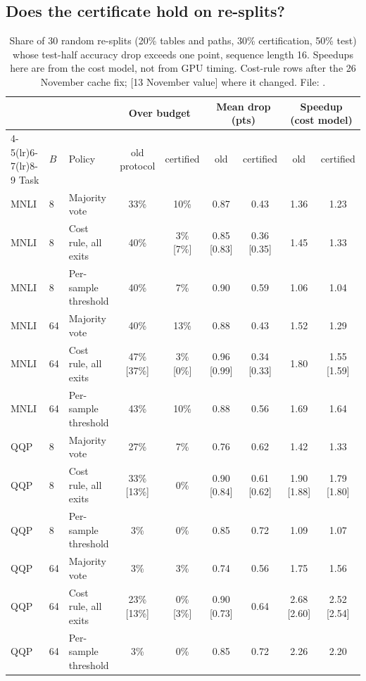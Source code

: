 \subsection{Does the certificate hold on re-splits?}\label{sec:resplit}
\begin{table}[ht]
  \centering\footnotesize\setlength{\tabcolsep}{3.5pt}
  \begin{tabular}{@{}lllcccccc@{}}
    \toprule
    & & & \multicolumn{2}{c}{Over budget} & \multicolumn{2}{c}{Mean drop (pts)} & \multicolumn{2}{c}{Speedup (cost model)} \\
    \cmidrule(lr){4-5}\cmidrule(lr){6-7}\cmidrule(lr){8-9}
    Task & $B$ & Policy & old protocol & certified & old & certified & old & certified \\
    \midrule
    MNLI & 8  & Majority vote        & 33\% & 10\% & 0.87 & 0.43 & 1.36\x & 1.23\x \\
    MNLI & 8  & Cost rule, all exits & 40\% & 3\% [7\%] & 0.85 [0.83] & 0.36 [0.35] & 1.45\x & 1.33\x \\
    MNLI & 8  & Per-sample threshold & 40\% & 7\%  & 0.90 & 0.59 & 1.06\x & 1.04\x \\
    MNLI & 64 & Majority vote        & 40\% & 13\% & 0.88 & 0.43 & 1.52\x & 1.29\x \\
    MNLI & 64 & Cost rule, all exits & 47\% [37\%] & 3\% [0\%] & 0.96 [0.99] & 0.34 [0.33] & 1.80\x & 1.55\x{} [1.59\x] \\
    MNLI & 64 & Per-sample threshold & 43\% & 10\% & 0.88 & 0.56 & 1.69\x & 1.64\x \\
    QQP  & 8  & Majority vote        & 27\% & 7\%  & 0.76 & 0.62 & 1.42\x & 1.33\x \\
    QQP  & 8  & Cost rule, all exits & 33\% [13\%] & 0\% & 0.90 [0.84] & 0.61 [0.62] & 1.90\x{} [1.88\x] & 1.79\x{} [1.80\x] \\
    QQP  & 8  & Per-sample threshold & 3\%  & 0\%  & 0.85 & 0.72 & 1.09\x & 1.07\x \\
    QQP  & 64 & Majority vote        & 3\%  & 3\%  & 0.74 & 0.56 & 1.75\x & 1.56\x \\
    QQP  & 64 & Cost rule, all exits & 23\% [13\%] & 0\% [3\%] & 0.90 [0.73] & 0.64 & 2.68\x{} [2.60\x] & 2.52\x{} [2.54\x] \\
    QQP  & 64 & Per-sample threshold & 3\%  & 0\%  & 0.85 & 0.72 & 2.26\x & 2.20\x \\
    \bottomrule
  \end{tabular}
  \caption{Share of 30 random re-splits (20\% tables and paths, 30\% certification, 50\% test) whose test-half
  accuracy drop exceeds one point, sequence length 16. Speedups here are from the cost model, not from GPU timing.
  Cost-rule rows after the 26 November cache fix; [13 November value] where it changed. File:
  .}
  \label{tab:resplit}
\end{table}

